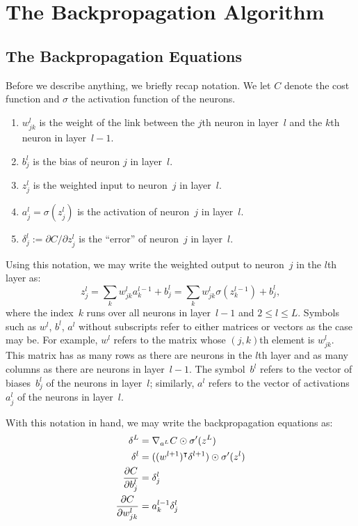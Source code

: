 \chapter{The Backpropagation Algorithm}

\section{The Backpropagation Equations}

Before we describe anything, we briefly recap notation. We let 
$C$ denote the cost function and $\sigma$ the activation function 
of the neurons. 
\begin{enumerate}
    \item $w_{j k}^{l}$ is the weight of the link between the $j$th
        neuron in layer~$l$ and the $k$th neuron in layer~$l - 1$.
    \item $b_j^l$ is the bias of neuron $j$ in layer~$l$.
    \item $z_{j}^l$ is the weighted input to neuron~$j$ in layer~$l$.
    \item $a_j^{l} = \sigma(z_{j}^l)$ is the activation of neuron~$j$ in 
        layer~$l$.
    \item $\delta_{j}^{l} := \partial C / \partial z_{j}^{l}$ is 
        the ``error'' of neuron~$j$ in layer~$l$.
\end{enumerate}

Using this notation, we may write the weighted output to neuron~$j$
in the $l$th layer as:
\[
    z_{j}^{l} = \sum_{k} w_{j k}^l a_{k}^{l - 1} + b_{j}^l = 
                \sum_{k} w_{j k}^l \sigma (z_{k}^{l - 1}) + b_{j}^l, 
\]
where the index~$k$ runs over all neurons in layer~$l - 1$ and 
$2 \leq l \leq L$. Symbols such as $w^{l}$, $b^{l}$, $a^{l}$ without 
subscripts refer to either matrices or vectors as the case may be. 
For example, $w^{l}$ refers to the matrix whose $(j, k)$th element 
is $w_{j k}^{l}$. This matrix has as many rows as there are neurons
in the $l$th layer and as many columns as there are neurons in 
layer~$l - 1$. The symbol~$b^{l}$ refers to the vector of 
biases~$b_{j}^l$ of the neurons in layer~$l$; similarly, $a^{l}$ 
refers to the vector of activations~$a_{j}^l$ of the neurons in 
layer~$l$.

With this notation in hand, we may write the backpropagation equations
as:
\begin{align}
    \delta^{L} & = \nabla_{a^L} C \odot \sigma'(z^L) \\
    \delta^{l} & = ( (w^{l + 1})^{\intercal} \delta^{l + 1} ) \odot \sigma'(z^l) \\
    \frac{\partial C}{\partial b_j^{l}} & = \delta_{j}^l \\
    \frac{\partial C}{\partial w_{j k}^l} & = a_{k}^{l - 1} \delta_{j}^l
\end{align}
